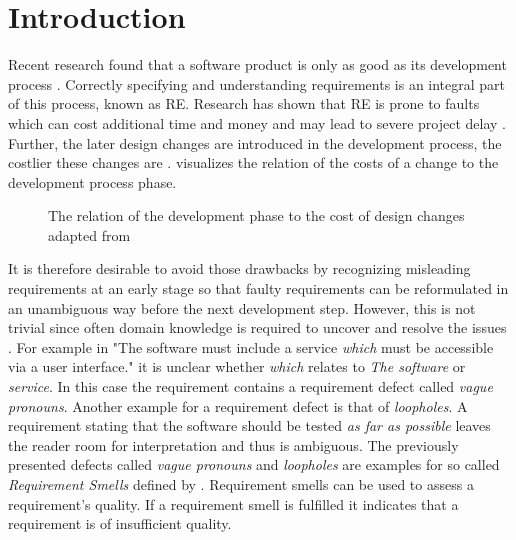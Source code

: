 
\chapter{Introduction}
\label{chp:introduction}

Recent research found that a software product is only as good as its development process \parencite{Hsia:1993}.
Correctly specifying and understanding requirements is an integral part of this process, known as \ac{RE}.
Research has shown that \ac{RE} is prone to faults which can cost additional time and money \parencite{Mendez:2016} and may lead to severe project delay \parencite{Femmer:2014}.
Further, the later design changes are introduced in the development process, the costlier these changes are \parencite{Folkestad:2001}.
 visualizes the relation of the costs of a change to the development process phase.
\begin{figure}[htpb]
    \centering
    \def\svgwidth{\columnwidth}
    
    \caption[Relation of Development Phase to Cost per Change]{The relation of the development phase to the cost of design changes adapted from \textcite{Folkestad:2001}}\label{fig:introduction:relation}
\end{figure}

It is therefore desirable to avoid those drawbacks by recognizing misleading requirements at an early stage so that faulty requirements can be reformulated in an unambiguous way before the next development step.
However, this is not trivial since often domain knowledge is required to uncover and resolve the issues \parencite{Femmer:2017}.
For example in "The software must include a service \textit{which} must be accessible via a user interface." it is unclear whether \textit{which} relates to \textit{The software} or \textit{service}.
In this case the requirement contains a requirement defect called \textit{vague pronouns}.
Another example for a requirement defect is that of \textit{loopholes}.
A requirement stating that the software should be tested \textit{as far as possible} leaves the reader room for interpretation and thus is ambiguous.
The previously presented defects called \textit{vague pronouns} and \textit{loopholes} are examples for so called \textit{Requirement Smells} defined by \textcite{Femmer:2017}.
Requirement smells can be used to assess a requirement's quality.
If a requirement smell is fulfilled it indicates that a requirement is of insufficient quality.

